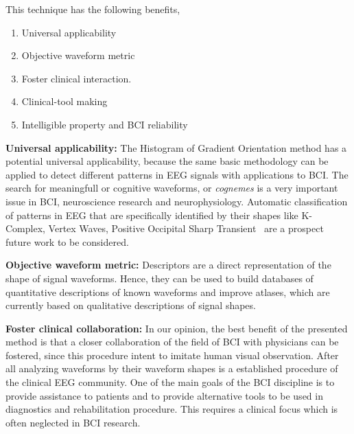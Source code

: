 

\vspace{5pt}

This technique has the following benefits,

\begin{enumerate}
\item Universal applicability
\item Objective waveform metric
\item Foster clinical interaction.
\item Clinical-tool making
\item Intelligible property and BCI reliability
\end{enumerate}

\textbf{Universal applicability:}
The Histogram of Gradient Orientation method has a potential universal applicability, because the same basic methodology can be applied to detect different patterns in EEG signals with applications to BCI.   The search for meaningfull or cognitive waveforms, or \textit{cognemes} is a very important issue in BCI, neuroscience research and neurophysiology. Automatic classification of patterns in EEG that are specifically identified by their shapes like K-Complex, Vertex Waves, Positive Occipital Sharp Transient~\cite{Hartman2005} are a prospect future work to be considered. 


\textbf{Objective waveform metric:}
Descriptors are a direct representation of the shape of signal waveforms. Hence,  they can be used to build databases of quantitative descriptions of known waveforms and improve atlases, which are currently based on qualitative descriptions of signal shapes.

\textbf{Foster clinical collaboration:}
In our opinion, the best benefit of the presented method is that a closer collaboration of the field of BCI with physicians can be fostered, since this procedure intent to imitate human visual observation. After all analyzing waveforms by their waveform shapes is a established procedure of the clinical EEG community. One of the main goals of the BCI discipline is to provide assistance to patients and to provide alternative tools to be used in diagnostics and rehabilitation procedure.  This requires a clinical focus which is often neglected in BCI research. 

